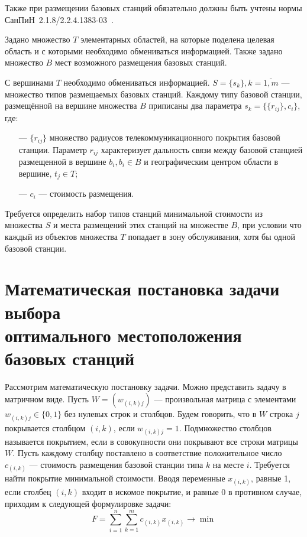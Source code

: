 Также при размещении базовых станций обязательно должны быть учтены нормы СанПиН~2.1.8/2.2.4.1383-03~\cite{sanpin}. 

Задано множество $T$ элементарных областей, на которые поделена целевая область и с которыми необходимо обмениваться информацией. Также задано множество $B$ мест возможного размещения базовых станций.

С вершинами $T$ необходимо обмениваться информацией. $S = \{s_k\}, k = \overline{1, m}$ --- множество типов размещаемых базовых станций. Каждому типу базовой станции, размещённой на вершине множества $B$ приписаны два параметра $s_k = \{\{r_{ij}\}, c_i\}$, где:
\begin{itemize}
	\item[---] $\{r_{ij}\}$ множество радиусов телекоммуникационного покрытия базовой станции. Параметр $r_{ij}$ характеризует дальность связи между базовой станцией размещенной в вершине $b_i, b_i \in B$ и географическим центром области в вершине, $t_j \in T$;
	\item[---] $c_i$ --- стоимость размещения.
\end{itemize}

Требуется определить набор типов станций минимальной стоимости из множества $S$ и места размещений этих станций на множестве $B$, при условии что каждый из объектов множества $T$ попадает в зону обслуживания, хотя бы одной базовой станции.

\section[Математическая постановка задачи выбора оптимального\\ местоположения базовых станций]{Математическая постановка задачи выбора\\ оптимального местоположения базовых станций}

Рассмотрим математическую постановку задачи. Можно представить задачу в матричном виде. Пусть $W = (w_{(i,k)j})$ --- произвольная матрица с элементами $w_{(i,k)j} \in \{0,1\}$ без нулевых строк и столбцов. Будем говорить, что в $W$ строка $j$ покрывается столбцом $(i,k)$, если $w_{(i,k)j} = 1$.  Подмножество столбцов называется покрытием, если в совокупности они покрывают все строки матрицы $W$. Пусть каждому столбцу поставлено в соответствие положительное число $c_{(i,k)}$ --- стоимость размещения базовой станции типа $k$ на месте $i$. Требуется найти покрытие минимальной стоимости. Вводя переменные $x_{(i,k)}$, равные 1, если столбец $(i,k)$ входит в искомое покрытие, и равные 0 в противном случае, приходим к следующей формулировке задачи: 
\vspace{-5mm}
\begin{equation}
	F = \sum_{i=1}^n\sum_{k=1}^m c_{(i,k)}x_{(i,k)} \rightarrow \min
\end{equation}

